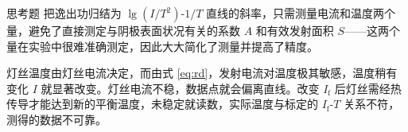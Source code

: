 \documentclass{labreport}
\begin{document}
\begin{labsection}{思考题}
把逸出功归结为 $\lg(I/T^2)$-$1/T$ 直线的斜率，只需测量电流和温度两个量，避免了直接测定与阴极表面状况有关的系数 $A$ 和有效发射面积 $S$——这两个量在实验中很难准确测定，因此大大简化了测量并提高了精度。

灯丝温度由灯丝电流决定，而由式 \eqref{eq:rd}，发射电流对温度极其敏感，温度稍有变化 $I$ 就显著改变。灯丝电流不稳，数据点就会偏离直线。改变 $I_\mathrm{f}$ 后灯丝需经热传导才能达到新的平衡温度，未稳定就读数，实际温度与标定的 $I_\mathrm{f}$-$T$ 关系不符，测得的数据不可靠。
\end{labsection}

\labcomment
{}

\end{document}
